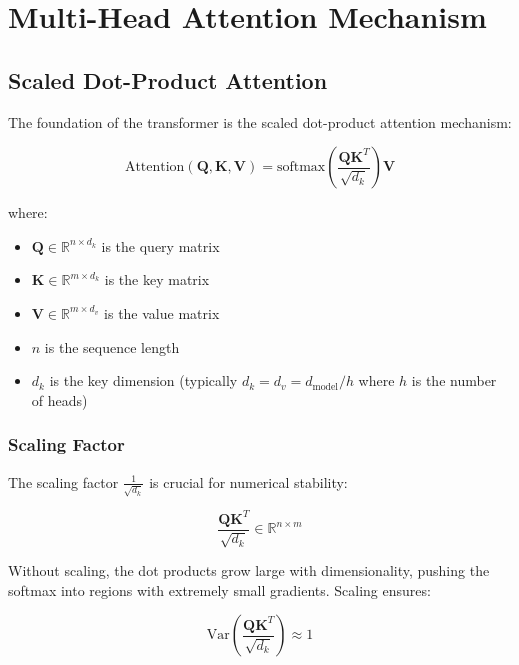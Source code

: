 \documentclass[11pt,a4paper]{article}
\begin{document}
\section{Multi-Head Attention Mechanism}

\subsection{Scaled Dot-Product Attention}

The foundation of the transformer is the scaled dot-product attention mechanism:

\begin{equation}
\text{Attention}(\mathbf{Q}, \mathbf{K}, \mathbf{V}) = \text{softmax}\left(\frac{\mathbf{Q}\mathbf{K}^T}{\sqrt{d_k}}\right)\mathbf{V}
\end{equation}

where:
\begin{itemize}
    \item $\mathbf{Q} \in \mathbb{R}^{n \times d_k}$ is the query matrix
    \item $\mathbf{K} \in \mathbb{R}^{m \times d_k}$ is the key matrix
    \item $\mathbf{V} \in \mathbb{R}^{m \times d_v}$ is the value matrix
    \item $n$ is the sequence length
    \item $d_k$ is the key dimension (typically $d_k = d_v = d_{\text{model}}/h$ where $h$ is the number of heads)
\end{itemize}

\subsubsection{Scaling Factor}

The scaling factor $\frac{1}{\sqrt{d_k}}$ is crucial for numerical stability:

\begin{equation}
\frac{\mathbf{Q}\mathbf{K}^T}{\sqrt{d_k}} \in \mathbb{R}^{n \times m}
\end{equation}

Without scaling, the dot products grow large with dimensionality, pushing the softmax into regions with extremely small gradients. Scaling ensures:

\begin{equation}
\text{Var}\left(\frac{\mathbf{Q}\mathbf{K}^T}{\sqrt{d_k}}\right) \approx 1
\end{equation}
\end{document}
